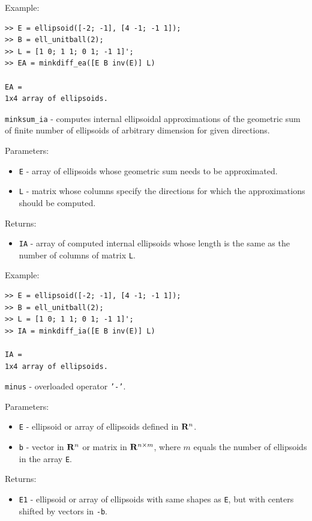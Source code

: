 \documentclass{report}
\begin{document}
Example:
{\tt \begin{verbatim}
>> E = ellipsoid([-2; -1], [4 -1; -1 1]);
>> B = ell_unitball(2);
>> L = [1 0; 1 1; 0 1; -1 1]';
>> EA = minkdiff_ea([E B inv(E)] L)

EA =
1x4 array of ellipsoids.
\end{verbatim} }

\newpage

{\Large {\tt minksum\_ia}} - computes internal ellipsoidal approximations
of the geometric sum of finite number of ellipsoids of arbitrary dimension
for given directions.

Parameters:
\begin{itemize}
\item {\tt E} - array of ellipsoids whose geometric sum needs to be
approximated.
\item {\tt L} - matrix whose columns specify the directions for which
the approximations should be computed.
\end{itemize}

Returns:
\begin{itemize}
\item {\tt IA} - array of computed internal ellipsoids whose length is the same
as the number of columns of matrix {\tt L}.
\end{itemize}

Example:
{\tt \begin{verbatim}
>> E = ellipsoid([-2; -1], [4 -1; -1 1]);
>> B = ell_unitball(2);
>> L = [1 0; 1 1; 0 1; -1 1]';
>> IA = minkdiff_ia([E B inv(E)] L)

IA =
1x4 array of ellipsoids.
\end{verbatim} }

\newpage

{\Large {\tt minus}} - overloaded operator {\tt '-'}.

Parameters:
\begin{itemize}
\item {\tt E} - ellipsoid or array of ellipsoids defined in ${\bf R}^n$.
\item {\tt b} - vector in ${\bf R}^n$ or matrix in ${\bf R}^{n\times m}$,
where $m$ equals the number of ellipsoids in the array {\tt E}.
\end{itemize}

Returns:
\begin{itemize}
\item {\tt E1} - ellipsoid or array of ellipsoids with same shapes as {\tt E},
but with centers shifted by vectors in {\tt -b}.
\end{itemize}
\end{document}
